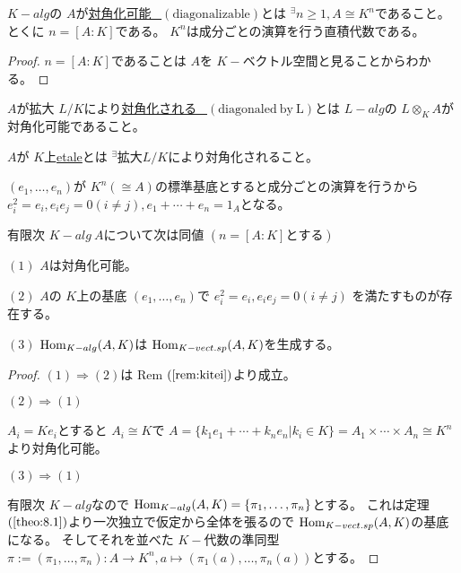 \documentclass[../master_galois_theory]{subfiles}
\begin{document}
\begin{defi}
  $K-alg$の $A$が\underline{対角化可能 \  $(\mathrm{diagonalizable})$}とは
  ${}^\exists n \geq 1 , A \cong K^n$であること。
  とくに $n = [A:K]$である。
  $K^n$は成分ごとの演算を行う直積代数である。
\end{defi}

\begin{proof}
  $n = [A:K]$であることは $A$を $K-$ベクトル空間と見ることからわかる。
\end{proof}

\begin{defi}
  $A$が拡大 $L/K$により\underline{対角化される \  $(\mathrm{diagonaled \  by \  L})$}とは
  $L-alg$の $L \otimes_K A$が対角化可能であること。
\end{defi}

\begin{defi}
  $A$が $K$上\underline{\rm{etale}}とは
  ${}^\exists 拡大 L/K$により対角化されること。
\end{defi}

\begin{rem} \label{rem:kitei}
  $(e_1 , \dots , e_n)$が $K^n (\cong A)$の標準基底とすると成分ごとの演算を行うから
  $e_i^2 = e_i , e_i e_j = 0 (i \neq j) , e_1 + \cdots + e_n = 1_A$となる。
\end{rem}

\begin{prop} \label{prop:8.3}
  有限次 $K-alg \  A$について次は同値
  $(n = [A:K]とする)$

  $(1)$
  $A$は対角化可能。

  $(2)$
  $A$の $K$上の基底 $(e_1 , \dots , e_n)$で
  $e_i^2 = e_i , e_i e_j = 0 (i \neq j)$
  を満たすものが存在する。

  $(3)$
  $\mathrm{Hom}_{K-alg}(A,K)$は $\mathrm{Hom}_{K-vect.sp}(A,K)$を生成する。
\end{prop}

\begin{proof}
  $(1) \Rightarrow (2)$は \rm{Rem} $(\mathrm{\ref{rem:kitei}})$より成立。

  $(2) \Rightarrow (1)$

  $A_i = K e_i$とすると $A_i \cong K$で
  $A = \{ k_1 e_1 + \cdots + k_n e_n | k_i \in K \} = A_1 \times \cdots \times A_n \cong K^n$
  より対角化可能。

  $(3) \Rightarrow (1)$

  有限次 $K-alg$なので $\mathrm{Hom}_{K-alg}(A,K) = \{ \pi_1 , \dots , \pi_n \}$とする。
  これは定理 $(\mathrm{\ref{theo:8.1}})$より一次独立で仮定から全体を張るので
  $\mathrm{Hom}_{K-vect.sp}(A,K)$の基底になる。
  そしてそれを並べた $K-$代数の準同型 $\pi := (\pi_1 , \dots , \pi_n) : A \longrightarrow K^n , a \longmapsto (\pi_1 (a) , \dots , \pi_n (a))$とする。
\end{proof}
\end{document}
